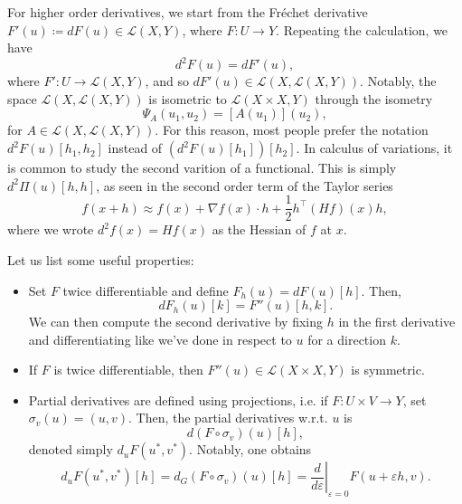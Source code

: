 For higher order derivatives, we start from the Fréchet derivative $F'(u) \coloneqq dF(u)\in \mathcal{L}(X,Y)$, where $F:U\to Y$. Repeating the calculation, we have
\begin{equation*}
    d^2 F(u) = dF'(u), 
\end{equation*} 
where $F': U\to \mathcal{L}(X,Y)$, and so $dF'(u) \in \mathcal{L}(X, \mathcal{L}(X,Y))$. Notably, the space $\mathcal{L}(X, \mathcal{L}(X,Y))$ is isometric to $\mathcal{L}(X\times X,Y)$ through the isometry
\begin{equation*}
    \Psi_A(u_1,u_2) = [A(u_1)](u_2),
\end{equation*} 
for $A\in \mathcal{L}(X,\mathcal{L}(X,Y))$. For this reason, most people prefer the notation $d^2 F(u) [h_1,h_2]$ instead of $(d^2 F(u)[h_1])[h_2]$. In calculus of variations, it is common to study the second varition of a functional. This is simply $d^2 \Pi(u)[h,h]$, as seen in the second order term of the Taylor series
\begin{equation*}
    f(x+h)\approx f(x) + \nabla f(x) \cdot h + \frac{1}{2} h^\top (Hf)(x) h,
\end{equation*} 
where we wrote $d^2 f(x) = Hf(x)$ as the Hessian of $f$ at $x$.

Let us list some useful properties:
\begin{itemize}
    \item Set $F$ twice differentiable and define $F_h(u)=dF(u)[h]$. Then,
    \begin{equation}\label{eq:second-derivative-property}
        dF_h(u)[k] = F''(u)[h,k]. 
    \end{equation}
    We can then compute the second derivative by fixing $h$ in the first derivative and differentiating like we've done in respect to $u$ for a direction $k$.
    \item If $F$ is twice differentiable, then $F''(u)\in \mathcal{L}(X\times X, Y)$ is symmetric.
    \item Partial derivatives are defined using projections, i.e. if $F: U\times V \to Y$, set $\sigma_v(u)=(u,v)$. Then, the partial derivatives w.r.t. $u$ is
    \begin{equation*}
        d(F\circ \sigma_v)(u)[h],
    \end{equation*}
    denoted simply $d_u F(u^*,v^*)$. Notably, one obtains
    \begin{equation*}
        d_u F(u^*,v^*)[h] = d_G(F\circ \sigma_v)(u)[h] = \left.\frac{d}{d\varepsilon}\right|_{\varepsilon = 0} F(u+\varepsilon h, v).
    \end{equation*}
\end{itemize}

